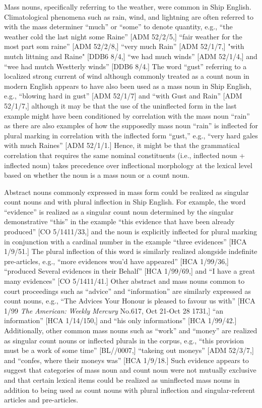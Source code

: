 Mass nouns, specifically referring to the weather, were common in Ship English. Climatological phenomena such as rain, wind, and lightning are often referred to with the mass determiner “much” or “some” to denote quantity, e.g., “the weather cold the last night some Raine” [ADM 52/2/5,] “fair weather for the most part som raine” [ADM 52/2/8,] “very much Rain” [ADM 52/1/7,] "with mutch littning and Raine" [DDB6 8/4,] “we had much winds” [ADM 52/1/4,] and “wee had mutch Westterly winds” [DDB6 8/4.] The word “gust” referring to a localized strong current of wind although commonly treated as a count noun in modern English appears to have also been used as a mass noun in Ship English, e.g., “blowing hard in gust” [ADM 52/1/7] and “with Gust and Rain” [ADM 52/1/7,] although it may be that the use of the uninflected form in the last example might have been conditioned by correlation with the mass noun “rain” as there are also examples of how the supposedly mass noun “rain” is inflected for plural marking in correlation with the inflected form “gust,” e.g., “very hard gales with much Raines” [ADM 52/1/1.] Hence, it might be that the grammatical correlation that requires the same nominal constituents (i.e., inflected noun + inflected noun) takes precedence over inflectional morphology at the lexical level based on whether the noun is a mass noun or a count noun. 

Abstract nouns commonly expressed in mass form could be realized as singular count nouns and with plural inflection in Ship English. For example, the word “evidence” is realized as a singular count noun determined by the singular demonstrative “this” in the example “this evidence that have been already produced” [CO 5/1411/33,] and the noun is explicitly inflected for plural marking in conjunction with a cardinal number in the example “three evidences” [HCA 1/9/51.] The plural inflection of this word is similarly realized alongside indefinite pre-articles, e.g., “more evidences wou’d have appeared” [HCA 1/99/36,] “produced Several evidences in their Behalf” [HCA 1/99/69,] and “I have a great many evidences” [CO 5/1411/41.] Other abstract and mass nouns common to court proceedings such as “advice” and “information” are similarly expressed as count nouns, e.g., “The Advices Your Honour is pleased to favour us with” [HCA 1/99 \textit{The} \textit{American:} \textit{Weekly} \textit{Mercury} No.617, Oct 21-Oct 28 1731,] “an information” [HCA 1/14/150,] and “his only informations” [HCA 1/99/42.] Additionally, other common mass nouns such as “work” and “money” are realized as singular count nouns or inflected plurals in the corpus, e.g., “this provision must be a work of some time” [BL/\citealt{Egerton2395}/0007,] “takeing out moneys” [ADM 52/3/7,] and “confes, where their moneys was” [HCA 1/9/18.] Such evidence appears to suggest that categories of mass noun and count noun were not mutually exclusive and that certain lexical items could be realized as uninflected mass nouns in addition to being used as count nouns with plural inflection and singular-referent articles and pre-articles. 

